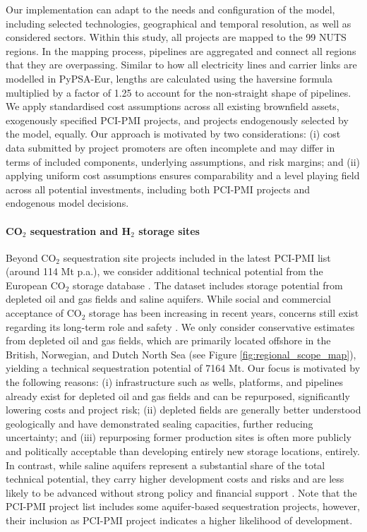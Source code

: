 \documentclass[pdflatex,sn-nature]{sn-jnl}%
\theoremstyle{thmstyleone}%
\theoremstyle{thmstyletwo}%
\theoremstyle{thmstylethree}%
\begin{document}
Our implementation can adapt to the needs and configuration of the model, including selected technologies, geographical and temporal resolution, as well as considered sectors. Within this study, all projects are mapped to the 99 NUTS regions. In the mapping process, pipelines are aggregated and connect all regions that they are overpassing. Similar to how all electricity lines and carrier links are modelled in PyPSA-Eur, lengths are calculated using the haversine formula multiplied by a factor of 1.25 to account for the non-straight shape of pipelines.
We apply standardised cost assumptions \cite{zeyenPyPSATechnologydataV01012025} across all existing brownfield assets, exogenously specified PCI-PMI projects, and projects endogenously selected by the model, equally. Our approach is motivated by two considerations: (i) cost data submitted by project promoters are often incomplete and may differ in terms of included components, underlying assumptions, and risk margins; and (ii) applying uniform cost assumptions ensures comparability and a level playing field across all potential investments, including both PCI-PMI projects and endogenous model decisions.

\paragraph{CO$_2$ sequestration and H$_2$ storage sites}\label{sec:co2_sequestration_sites}
Beyond CO$_2$ sequestration site projects included in the latest PCI-PMI list (around 114 Mt p.a.), we consider additional technical potential from the European CO$_2$ storage database \cite{europeancommissionEuropeanCO2Storage2020,hofmannH2CO2Network2025}. The dataset includes storage potential from depleted oil and gas fields and saline aquifers. While social and commercial acceptance of CO$_2$ storage has been increasing in recent years, concerns still exist regarding its long-term role and safety \cite{vanalphenSocietalAcceptanceCarbon2007}.
We only consider conservative estimates from depleted oil and gas fields, which are primarily located offshore in the British, Norwegian, and Dutch North Sea (see Figure \ref{fig:regional_scope_map}), yielding a technical sequestration potential of 7164 Mt. Our focus is motivated by the following reasons: (i) infrastructure such as wells, platforms, and pipelines already exist for depleted oil and gas fields and can be repurposed, significantly lowering costs and project risk; (ii) depleted fields are generally better understood geologically and have demonstrated sealing capacities, further reducing uncertainty; and (iii) repurposing former production sites is often more publicly and politically acceptable than developing entirely new storage locations, entirely. In contrast, while saline aquifers represent a substantial share of the total technical potential, they carry higher development costs and risks and are less likely to be advanced without strong policy and financial support \cite{europeancommissionEuropeanCO2Storage2020}. Note that the PCI-PMI project list includes some aquifer-based sequestration projects, however, their inclusion as PCI-PMI project indicates a higher likelihood of development.
\end{document}
